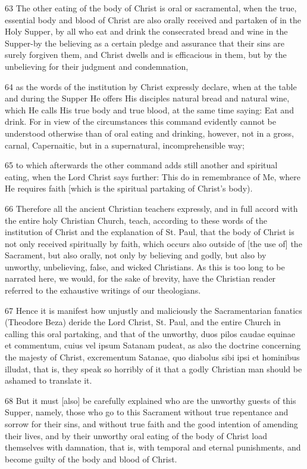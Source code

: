 63 The other eating of the body of Christ is oral or sacramental, when the true, essential body and blood of Christ are also orally received and partaken of in the Holy Supper, by all who eat and drink the consecrated bread and wine in the Supper-by the believing as a certain pledge and assurance that their sins are surely forgiven them, and Christ dwells and is efficacious in them, but by the unbelieving for their judgment and condemnation,

64 as the words of the institution by Christ expressly declare, when at the table and during the Supper He offers His disciples natural bread and natural wine, which He calls His true body and true blood, at the same time saying: Eat and drink. For in view of the circumstances this command evidently cannot be understood otherwise than of oral eating and drinking, however, not in a gross, carnal, Capernaitic, but in a supernatural, incomprehensible way;

65 to which afterwards the other command adds still another and spiritual eating, when the Lord Christ says further: This do in remembrance of Me, where He requires faith [which is the spiritual partaking of Christ’s body).

66 Therefore all the ancient Christian teachers expressly, and in full accord with the entire holy Christian Church, teach, according to these words of the institution of Christ and the explanation of St. Paul, that the body of Christ is not only received spiritually by faith, which occurs also outside of [the use of] the Sacrament, but also orally, not only by believing and godly, but also by unworthy, unbelieving, false, and wicked Christians. As this is too long to be narrated here, we would, for the sake of brevity, have the Christian reader referred to the exhaustive writings of our theologians.

67 Hence it is manifest how unjustly and maliciously the Sacramentarian fanatics (Theodore Beza) deride the Lord Christ, St. Paul, and the entire Church in calling this oral partaking, and that of the unworthy, duos pilos caudae equinae et commentum, cuius vel ipsum Satanam pudeat, as also the doctrine concerning the majesty of Christ, excrementum Satanae, quo diabolus sibi ipsi et hominibus illudat, that is, they speak so horribly of it that a godly Christian man should be ashamed to translate it.

68 But it must [also] be carefully explained who are the unworthy guests of this Supper, namely, those who go to this Sacrament without true repentance and sorrow for their sins, and without true faith and the good intention of amending their lives, and by their unworthy oral eating of the body of Christ load themselves with damnation, that is, with temporal and eternal punishments, and become guilty of the body and blood of Christ.

